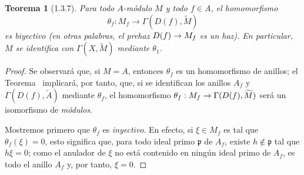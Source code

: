 \documentclass[oneside]{amsart}
\theoremstyle{ega-env-style}
\theoremstyle{ega-thm-env-style}
\newtheorem*{theorem}{Teorema}
\theoremstyle{ega-defn-env-style}
\renewcommand{\to}{\mathchoice{\longrightarrow}{\rightarrow}{\rightarrow}{\rightarrow}}
\let\EGAOriginalLabel\label
\renewcommand{\label}[1]{\phantomsection\EGAOriginalLabel{#1}}
\begin{document}
\begin{theorem}[1.3.7]
\label{I.1.3.7}
Para todo $A$-módulo $M$ y todo $f\in A$, el homomorfismo
\[
  \theta_f:M_f\longrightarrow\Gamma(D(f),\widetilde{M})
\]
es biyectivo \textup{(en otras palabras, el prehaz $D(f)\to M_f$ es un \emph{haz})}.
En particular, $M$ se identifica con $\Gamma(X,\widetilde{M})$ mediante $\theta_1$.
\end{theorem}

\begin{proof}
Se observará que, si $M=A$, entonces $\theta_f$ es un homomorfismo de anillos;
el Teorema~ implicará, por tanto, que, si se identifican los anillos $A_f$ y $\Gamma(D(f),\widetilde{A})$ mediante $\theta_f$, el homomorfismo $\theta_f:M_f\to\Gamma(D(f),\widetilde{M})$ será un isomorfismo de \emph{módulos}.

Mostremos primero que $\theta_f$ es \emph{inyectivo}.
En efecto, si $\xi\in M_f$ es tal que $\theta_f(\xi)=0$, esto significa que, para todo ideal primo $\mathfrak{p}$ de $A_f$, existe $h\notin\mathfrak{p}$ tal que $h\xi=0$;
como el anulador de $\xi$ no está contenido en ningún ideal primo de $A_f$, es todo el anillo $A_f$ y, por tanto, $\xi=0$.


\end{proof}
\end{document}
